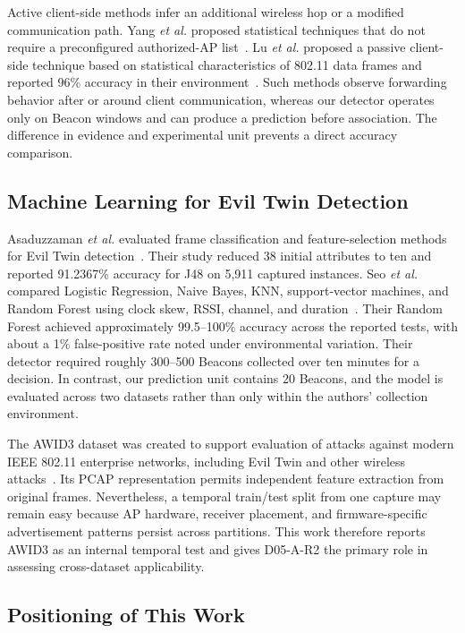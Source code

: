 \documentclass[conference]{IEEEtran}
\begin{document}
Active client-side methods infer an additional wireless hop or a modified communication path. Yang \emph{et al.} proposed statistical techniques that do not require a preconfigured authorized-AP list~\cite{yang2012active}. Lu \emph{et al.} proposed a passive client-side technique based on statistical characteristics of 802.11 data frames and reported 96\% accuracy in their environment~\cite{lu2018etspotter}. Such methods observe forwarding behavior after or around client communication, whereas our detector operates only on Beacon windows and can produce a prediction before association. The difference in evidence and experimental unit prevents a direct accuracy comparison.

\subsection{Machine Learning for Evil Twin Detection}

Asaduzzaman \emph{et al.} evaluated frame classification and feature-selection methods for Evil Twin detection~\cite{asaduzzaman2020frames}. Their study reduced 38 initial attributes to ten and reported 91.2367\% accuracy for J48 on 5,911 captured instances. Seo \emph{et al.} compared Logistic Regression, Naive Bayes, KNN, support-vector machines, and Random Forest using clock skew, RSSI, channel, and duration~\cite{seo2020reliability}. Their Random Forest achieved approximately 99.5--100\% accuracy across the reported tests, with about a 1\% false-positive rate noted under environmental variation. Their detector required roughly 300--500 Beacons collected over ten minutes for a decision. In contrast, our prediction unit contains 20 Beacons, and the model is evaluated across two datasets rather than only within the authors' collection environment.

The AWID3 dataset was created to support evaluation of attacks against modern IEEE 802.11 enterprise networks, including Evil Twin and other wireless attacks~\cite{chatzoglou2021awid3}. Its PCAP representation permits independent feature extraction from original frames. Nevertheless, a temporal train/test split from one capture may remain easy because AP hardware, receiver placement, and firmware-specific advertisement patterns persist across partitions. This work therefore reports AWID3 as an internal temporal test and gives D05-A-R2 the primary role in assessing cross-dataset applicability.

\subsection{Positioning of This Work}
\end{document}
